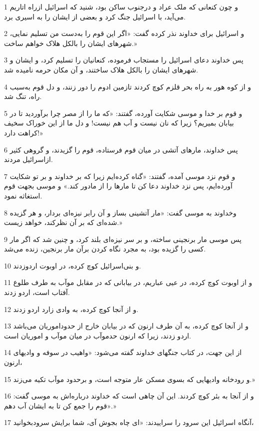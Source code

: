\par 1 و چون کنعانی که ملک عراد و درجنوب ساکن بود، شنید که اسرائیل ازراه اتاریم می‌آید، با اسرائیل جنگ کرد و بعضی از ایشان را به اسیری برد.
\par 2 و اسرائیل برای خداوند نذر کرده گفت: «اگر این قوم را به‌دست من تسلیم نمایی، شهرهای ایشان را بالکل هلاک خواهم ساخت.»
\par 3 پس خداوند دعای اسرائیل را مستجاب فرموده، کنعانیان را تسلیم کرد، و ایشان و شهرهای ایشان را بالکل هلاک ساختند، و آن مکان حرمه نامیده شد.
\par 4 و از کوه هور به راه بحر قلزم کوچ کردند تازمین ادوم را دور زنند، و دل قوم به‌سبب راه، تنگ شد.
\par 5 و قوم بر خدا و موسی شکایت آورده، گفتند: «که ما را از مصر چرا برآوردید تا در بیابان بمیریم؟ زیرا که نان نیست و آب هم نیست! و دل ما از این خوراک سخیف کراهت دارد!»
\par 6 پس خداوند، مارهای آتشی در میان قوم فرستاده، قوم را گزیدند، و گروهی کثیر ازاسرائیل مردند.
\par 7 و قوم نزد موسی آمده، گفتند: «گناه کرده‌ایم زیرا که بر خداوند و بر تو شکایت آورده‌ایم، پس نزد خداوند دعا کن تا مارها را از مادور کند.» و موسی بجهت قوم استغاثه نمود.
\par 8 وخداوند به موسی گفت: «مار آتشینی بساز و آن رابر نیزه‌ای بردار، و هر گزیده شده‌ای که بر آن نظرکند، خواهد زیست.»
\par 9 پس موسی مار برنجینی ساخته، و بر سر نیزه‌ای بلند کرد، و چنین شد که اگر مار کسی را گزیده بود، به مجرد نگاه کردن برآن مار برنجین، زنده می‌شد.
\par 10 و بنی‌اسرائیل کوچ کرده، در اوبوت اردوزدند.
\par 11 و از اوبوت کوچ کرده، در عیی عباریم، در بیابانی که در مقابل موآب به طرف طلوع آفتاب است، اردو زدند.
\par 12 و از آنجا کوچ کرده، به وادی زارد اردو زدند.
\par 13 و از آنجا کوچ کرده، به آن طرف ارنون که در بیابان خارج از حدوداموریان می‌باشد اردو زدند، زیرا که ارنون حدموآب در میان موآب و اموریان است.
\par 14 از این جهت، در کتاب جنگهای خداوند گفته می‌شود: «واهیب در سوفه و وادیهای ارنون،
\par 15 و رودخانه وادیهایی که بسوی مسکن عار متوجه است، و برحدود موآب تکیه می‌زند.»
\par 16 و از آنجا به بئر کوچ کردند. این آن چاهی است که خداوند درباره‌اش به موسی گفت: «قوم را جمع کن تا به ایشان آب دهم.»
\par 17 آنگاه اسرائیل این سرود را سراییدند: «ای چاه بجوش آی، شما برایش سرودبخوانید،
